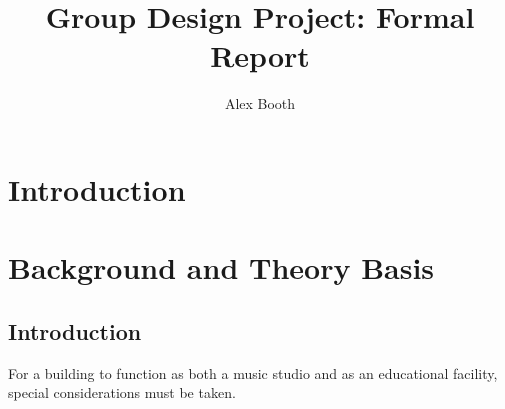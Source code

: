 \documentclass[10pt, twocolumn]{article}
\title{Group Design Project: Formal Report}
\author{Alex Booth}
\begin{document}
    \maketitle

    \section{Introduction}
        \lipsum
    \section{Background and Theory Basis}
        \subsection{Introduction}
            For a building to function as both a music studio and as an educational facility, special considerations must be taken.
\end{document}
